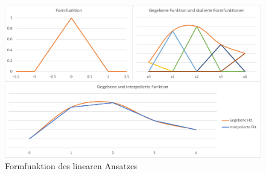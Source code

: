 %
%
%
\begin{figure}
    \centering
    \includegraphics[width=\textwidth]{papers/fem/images/linearer_ansatz_entwurf.pdf}
    \caption{Formfunktion des linearen Ansatzes}
    \label{fem:1d:abb:linear}
    \end{figure}
    